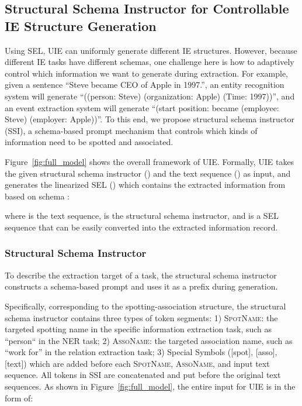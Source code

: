 \documentclass[11pt]{article}
\begin{document}
\subsection{Structural Schema Instructor for Controllable IE Structure Generation} \label{sec:schema_Instructor}
Using SEL, UIE can uniformly generate different IE structures.
However, because different IE tasks have different schemas, one challenge here is how to adaptively control which information we want to generate during extraction.
For example, given a sentence ``Steve became CEO of Apple in 1997.'', an entity recognition system will generate ``((person: Steve) (organization: Apple) (Time: 1997))'', and an event extraction system will generate ``(start position: became (employee: Steve) (employer: Apple))''.
To this end, we propose structural schema instructor (SSI), a schema-based prompt mechanism that controls which kinds of information need to be spotted and associated.

Figure~\ref{fig:full_model} shows the overall framework of UIE.
Formally, UIE takes the given structural schema instructor () and the text sequence () as input, and generates the linearized SEL () which contains the extracted information from  based on schema :

where  is the text sequence,  is the structural schema instructor, and  is a SEL sequence that can be easily converted into the extracted information record.

\subsubsection{Structural Schema Instructor}
To describe the extraction target of a task, the structural schema instructor constructs a schema-based prompt and uses it as a prefix during generation.

Specifically, corresponding to the spotting-association structure, the structural schema instructor contains three types of token segments:
1) \textsc{SpotName}: the targeted spotting name in the specific information extraction task, such as ``person`` in the NER task; 
2) \textsc{AssoName}: the targeted association name, such as ``work for'' in the relation extraction task;
3) Special Symbols ([spot], [asso], [text]) which are added before each \textsc{SpotName}, \textsc{AssoName}, and input text sequence.
All tokens in SSI are concatenated and put before the original text sequences.
As shown in Figure~\ref{fig:full_model}, the entire input for UIE is in the form of:
\end{document}
